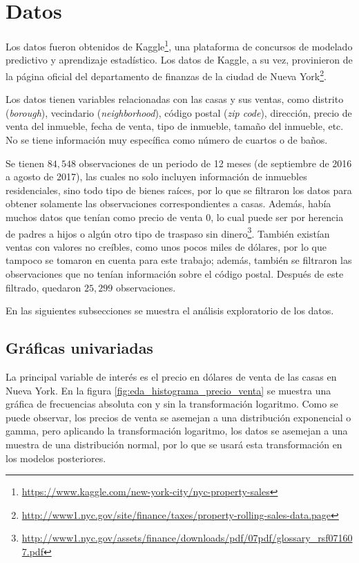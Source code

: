 
\section{Datos}
\label{sec:datos}

Los datos fueron obtenidos de Kaggle\footnote{\url{https://www.kaggle.com/new-york-city/nyc-property-sales}}, una plataforma de concursos de modelado predictivo y aprendizaje estadístico. Los datos de Kaggle, a su vez, provinieron de la página oficial del departamento de finanzas de la ciudad de Nueva York\footnote{\url{http://www1.nyc.gov/site/finance/taxes/property-rolling-sales-data.page}}.

Los datos tienen variables relacionadas con las casas y sus ventas, como distrito (\textit{borough}), vecindario (\textit{neighborhood}), código postal (\textit{zip code}), dirección, precio de venta del inmueble, fecha de venta, tipo de inmueble, tamaño del inmueble, etc. No se tiene información muy específica como número de cuartos o de baños.

Se tienen $84,548$ observaciones de un periodo de 12 meses (de septiembre de 2016 a agosto de 2017), las cuales no solo incluyen información de inmuebles residenciales, sino todo tipo de bienes raíces, por lo que se filtraron los datos para obtener solamente las observaciones correspondientes a casas. Además, había muchos datos que tenían como precio de venta 0, lo cual puede ser por herencia de padres a hijos o algún otro tipo de traspaso sin dinero\footnote{\url{http://www1.nyc.gov/assets/finance/downloads/pdf/07pdf/glossary_rsf071607.pdf}}. También existían ventas con valores no creíbles, como unos pocos miles de dólares, por lo que tampoco se tomaron en cuenta para este trabajo; además, también se filtraron las observaciones que no tenían información sobre el código postal. Después de este filtrado, quedaron $25,299$ observaciones.

En las siguientes subsecciones se muestra el análisis exploratorio de los datos.

\subsection{Gráficas univariadas}

La principal variable de interés es el precio en dólares de venta de las casas en Nueva York. En la figura \ref{fig:eda_histograma_precio_venta} se muestra una gráfica de frecuencias absoluta con y sin la transformación logaritmo. Como se puede observar, los precios de venta se asemejan a una distribución exponencial o gamma, pero aplicando la transformación logaritmo, los datos se asemejan a una muestra de una distribución normal, por lo que se usará esta transformación en los modelos posteriores.

